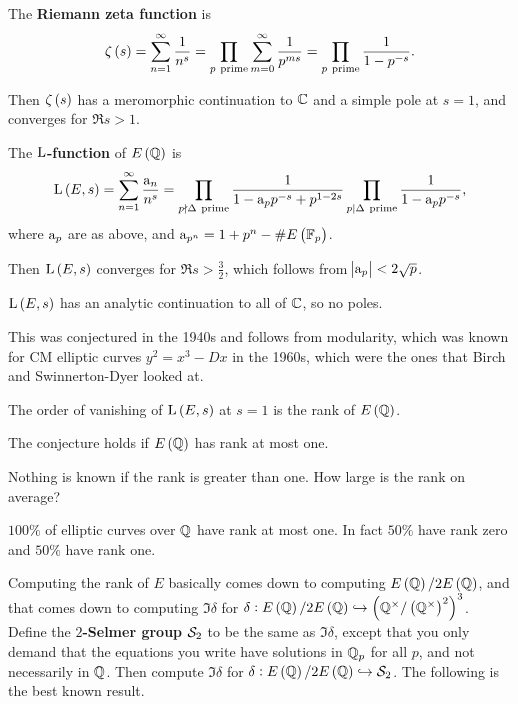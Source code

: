 \begin{definition}
The \textbf{Riemann zeta function} is
$$ \zeta\br{s} = \sum_{n = 1}^\infty \dfrac{1}{n^s} = \prod_{p \ \text{prime}} \sum_{m = 0}^\infty \dfrac{1}{p^{ms}} = \prod_{p \ \text{prime}} \dfrac{1}{1 - p^{-s}}. $$
\end{definition}

Then $ \zeta\br{s} $ has a meromorphic continuation to $ \mathbb{C} $ and a simple pole at $ s = 1 $, and converges for $ \Re s > 1 $.

\begin{definition}
The \textbf{$ \mathrm{L} $-function} of $ E\br{\QQ} $ is
$$ \L\br{E, s} = \sum_{n = 1}^\infty \dfrac{\a_n}{n^s} = \prod_{p \nmid \Delta \ \text{prime}} \dfrac{1}{1 - \a_pp^{-s} + p^{1 - 2s}}\prod_{p \mid \Delta \ \text{prime}} \dfrac{1}{1 - \a_pp^{-s}}, $$
where $ \mathrm{a}_p $ are as above, and $ \a_{p^n} = 1 + p^n - \#E\br{\FF_p} $.
\end{definition}

Then $ \L\br{E, s} $ converges for $ \Re s > \tfrac{3}{2} $, which follows from $ \abs{\mathrm{a}_p} < 2\sqrt{p} $.

\begin{theorem}
$ \L\br{E, s} $ has an analytic continuation to all of $ \mathbb{C} $, so no poles.
\end{theorem}

This was conjectured in the 1940s and follows from modularity, which was known for CM elliptic curves $ y^2 = x^3 - Dx $ in the 1960s, which were the ones that Birch and Swinnerton-Dyer looked at.

\begin{conjecture}
The order of vanishing of $ \L\br{E, s} $ at $ s = 1 $ is the rank of $ E\br{\QQ} $.
\end{conjecture}

\begin{theorem}
The conjecture holds if $ E\br{\QQ} $ has rank at most one.
\end{theorem}

Nothing is known if the rank is greater than one. How large is the rank on average?

\begin{conjecture}
$ 100\% $ of elliptic curves over $ \mathbb{Q} $ have rank at most one. In fact $ 50\% $ have rank zero and $ 50\% $ have rank one.
\end{conjecture}

Computing the rank of $ E $ basically comes down to computing $ E\br{\QQ} / 2E\br{\QQ} $, and that comes down to computing $ \Im \delta $ for $ \delta : E\br{\QQ} / 2E\br{\QQ} \hookrightarrow \br{\QQ^\times / \br{\QQ^\times}^2}^3 $. Define the \textbf{$ 2 $-Selmer group} $ \mathcal{S}_2 $ to be the same as $ \Im \delta $, except that you only demand that the equations you write have solutions in $ \mathbb{Q}_p $ for all $ p $, and not necessarily in $ \mathbb{Q} $. Then compute $ \Im \delta $ for $ \delta : E\br{\QQ} / 2E\br{\QQ} \hookrightarrow \SSS_2 $. The following is the best known result.

